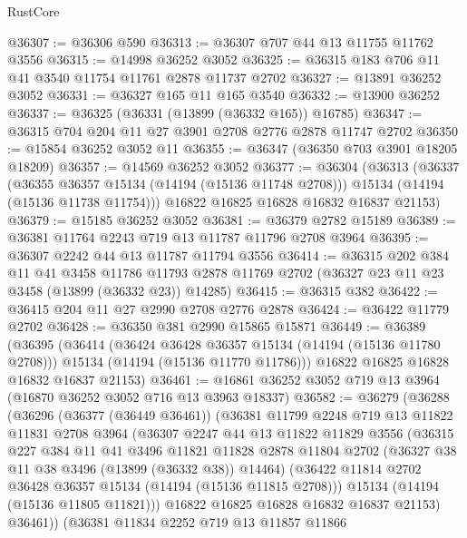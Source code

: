 \begin{lexlean}{RustCore}
\begin{coremodule}
@36307 := @36306 @590
@36313 := @36307 @707 @44 @13 @11755 @11762 @3556
@36315 := @14998 @36252 @3052
@36325 := @36315 @183 @706 @11 @41 @3540 @11754 @11761 @2878 @11737 @2702
@36327 := @13891 @36252 @3052
@36331 := @36327 @165 @11 @165 @3540
@36332 := @13900 @36252
@36337 := @36325 (@36331 (@13899 (@36332 @165)) @16785)
@36347 := @36315 @704 @204 @11 @27 @3901 @2708 @2776 @2878 @11747 @2702
@36350 := @15854 @36252 @3052 @11
@36355 := @36347 (@36350 @703 @3901 @18205 @18209)
@36357 := @14569 @36252 @3052
@36377 := @36304
    (@36313
      (@36337
        (@36355 @36357 @15134 (@14194 (@15136 @11748 @2708)))
        @15134
        (@14194 (@15136 @11738 @11754)))
      @16822
      @16825
      @16828
      @16832
      @16837
      @21153)
@36379 := @15185 @36252 @3052
@36381 := @36379 @2782 @15189
@36389 := @36381 @11764 @2243 @719 @13 @11787 @11796 @2708 @3964
@36395 := @36307 @2242 @44 @13 @11787 @11794 @3556
@36414 := @36315
    @202
    @384
    @11
    @41
    @3458
    @11786
    @11793
    @2878
    @11769
    @2702
    (@36327 @23 @11 @23 @3458 (@13899 (@36332 @23)) @14285)
@36415 := @36315 @382
@36422 := @36415 @204 @11 @27 @2990 @2708 @2776 @2878
@36424 := @36422 @11779 @2702
@36428 := @36350 @381 @2990 @15865 @15871
@36449 := @36389
    (@36395
      (@36414
        (@36424 @36428 @36357 @15134 (@14194 (@15136 @11780 @2708)))
        @15134
        (@14194 (@15136 @11770 @11786)))
      @16822
      @16825
      @16828
      @16832
      @16837
      @21153)
@36461 := @16861 @36252 @3052 @719 @13 @3964 (@16870 @36252 @3052 @716 @13 @3963 @18337)
@36582 := @36279
    (@36288
      (@36296
        (@36377 (@36449 @36461))
        (@36381
          @11799
          @2248
          @719
          @13
          @11822
          @11831
          @2708
          @3964
          (@36307
            @2247
            @44
            @13
            @11822
            @11829
            @3556
            (@36315
              @227
              @384
              @11
              @41
              @3496
              @11821
              @11828
              @2878
              @11804
              @2702
              (@36327 @38 @11 @38 @3496 (@13899 (@36332 @38)) @14464)
              (@36422 @11814 @2702 @36428 @36357 @15134 (@14194 (@15136 @11815 @2708)))
              @15134
              (@14194 (@15136 @11805 @11821)))
            @16822
            @16825
            @16828
            @16832
            @16837
            @21153)
          @36461))
      (@36381
        @11834
        @2252
        @719
        @13
        @11857
        @11866

\end{coremodule}
\end{lexlean}
